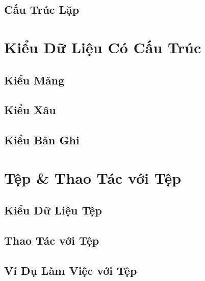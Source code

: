 \documentclass[oneside]{book}
\numberwithin{equation}{section}
\begin{document}
\section{Cấu Trúc Lặp}


\chapter{Kiểu Dữ Liệu Có Cấu Trúc}

\section{Kiểu Mảng}


\section{Kiểu Xâu}


\section{Kiểu Bản Ghi}


\chapter{Tệp \& Thao Tác với Tệp}

\section{Kiểu Dữ Liệu Tệp}


\section{Thao Tác với Tệp}


\section{Ví Dụ Làm Việc với Tệp}
\end{document}
